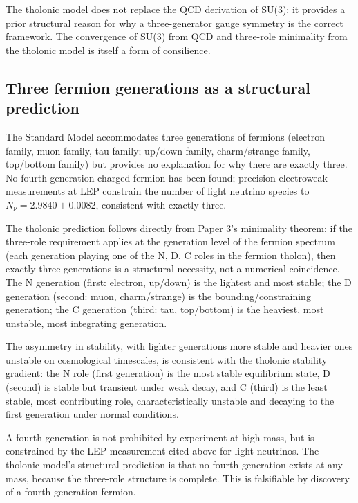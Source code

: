 \documentclass[12pt]{article}
\begin{document}
The tholonic model does not replace the QCD derivation of SU(3); it
provides a prior structural reason for why a three-generator gauge
symmetry is the correct framework. The convergence of SU(3) from QCD and
three-role minimality from the tholonic model is itself a form of
consilience.

\subsection{Three fermion generations as a structural prediction}\label{three-fermion-generations-as-a-structural-prediction}

The Standard Model accommodates three generations of fermions (electron
family, muon family, tau family; up/down family, charm/strange family,
top/bottom family) but provides no explanation for why there are exactly
three. No fourth-generation charged fermion has been found; precision
electroweak measurements at LEP constrain the number of light neutrino
species to \(N_\nu = 2.9840 \pm 0.0082\), consistent with exactly three.

The tholonic prediction follows directly from
\href{https://github.com/baardev/truevalue/blob/main/docnav/Research/papers/3_minimal-recursive-triadic-framework/3_minimal-recursive-triadic-framework.pdf}{Paper
3's} minimality theorem: if the three-role requirement applies at the
generation level of the fermion spectrum (each generation playing one of
the N, D, C roles in the fermion tholon), then exactly three generations
is a structural necessity, not a numerical coincidence. The N generation
(first: electron, up/down) is the lightest and most stable; the D
generation (second: muon, charm/strange) is the bounding/constraining
generation; the C generation (third: tau, top/bottom) is the heaviest,
most unstable, most integrating generation.

The asymmetry in stability, with lighter generations more stable and
heavier ones unstable on cosmological timescales, is consistent with the
tholonic stability gradient: the N role (first generation) is the most
stable equilibrium state, D (second) is stable but transient under weak
decay, and C (third) is the least stable, most contributing role,
characteristically unstable and decaying to the first generation under
normal conditions.

A fourth generation is not prohibited by experiment at high mass, but is
constrained by the LEP measurement cited above for light neutrinos. The
tholonic model's structural prediction is that no fourth generation
exists at any mass, because the three-role structure is complete. This
is falsifiable by discovery of a fourth-generation fermion.
\end{document}
